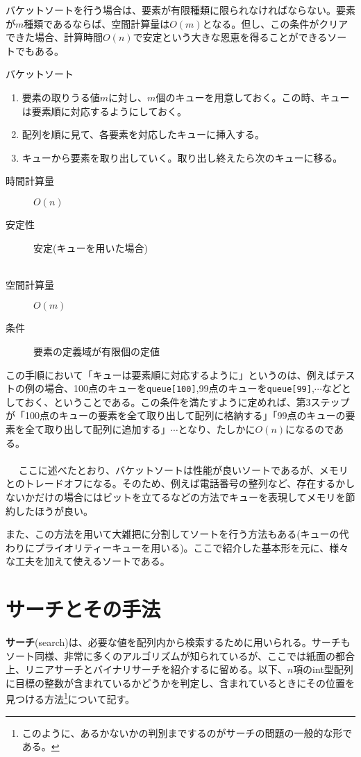 バケットソートを行う場合は、要素が有限種類に限られなければならない。要素が$m$種類であるならば、空間計算量は$O(m)$となる。但し、この条件がクリアできた場合、計算時間$O(n)$で安定という大きな恩恵を得ることができるソートでもある。
\begin{itembox}[l]{バケットソート}
\begin{enumerate}
\item 要素の取りうる値$m$に対し、$m$個のキューを用意しておく。この時、キューは要素順に対応するようにしておく。
\item 配列を順に見て、各要素を対応したキューに挿入する。
\item キューから要素を取り出していく。取り出し終えたら次のキューに移る。
\end{enumerate}
\begin{multicols}{2}
\begin{description}
\item[時間計算量] $O(n)$
\item[安定性] 安定(キューを用いた場合) 　\\　
\item[空間計算量] $O(m)$
\item[条件] 要素の定義域が有限個の定値
\end{description}
\end{multicols}
\end{itembox}

この手順において「キューは要素順に対応するように」というのは、例えばテストの例の場合、100点のキューを\verb|queue[100]|,99点のキューを\verb|queue[99]|,$\cdots$などとしておく、ということである。この条件を満たすように定めれば、第3ステップが「100点のキューの要素を全て取り出して配列に格納する」「99点のキューの要素を全て取り出して配列に追加する」$\cdots$となり、たしかに$O(n)$になるのである。
\\ \\　
ここに述べたとおり、バケットソートは性能が良いソートであるが、メモリとのトレードオフになる。そのため、例えば電話番号の整列など、存在するかしないかだけの場合にはビットを立てるなどの方法でキューを表現してメモリを節約したほうが良い。

また、この方法を用いて大雑把に分割してソートを行う方法もある(キューの代わりにプライオリティーキューを用いる)。ここで紹介した基本形を元に、様々な工夫を加えて使えるソートである。

\section{サーチとその手法}
\textbf{サーチ}(search)は、必要な値を配列内から検索するために用いられる。サーチもソート同様、非常に多くのアルゴリズムが知られているが、ここでは紙面の都合上、リニアサーチとバイナリサーチを紹介するに留める。以下、$n$項のint型配列に目標の整数が含まれているかどうかを判定し、含まれているときにその位置を見つける方法\footnote{このように、あるかないかの判別までするのがサーチの問題の一般的な形である。}について記す。

